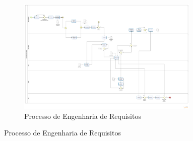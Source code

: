   \begin{figure}
    \begin{figure}[H]
      \centering
      \includegraphics[width=0.95\textwidth]{figuras/ModeloV5}
      \caption{Processo de Engenharia de Requisitos}
      \label{fig:processo}
    \end{figure}
  \end{figure}
  \clearpage
